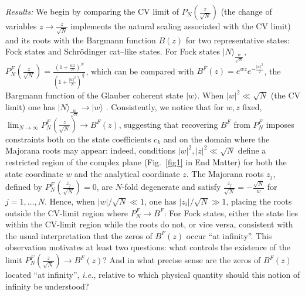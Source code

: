 \documentclass[aps,prl,showpacs,twocolumn]{revtex4-2}
\providecommand{\ket}[1]{\lvert #1 \rangle}
\providecommand{\ket}[1]{\lvert #1 \rangle}
\providecommand{\ket}[1]{\lvert #1 \rangle}
\providecommand{\ket}[1]{\lvert #1 \rangle}
\begin{document}
{\it Results:}  We begin by comparing the CV limit of $P_N\!\left(\frac{z}{\sqrt{N}}\right)$ (the change of variables $z \to \frac{z}{\sqrt{N}}$ implements the natural scaling associated with the CV limit) and its roots with the Bargmann function $B(z)$ for two representative states: Fock states and Schr\"odinger cat--like states. For Fock states $\ket{N}_{\frac{w}{\sqrt{N}}}$, $P_N^{F}\!\left(\frac{z}{\sqrt{N}}\right) = \frac{\left(1+\frac{w z}{N}\right)^N}{\left(1+\frac{|w|^2}{N}\right)^\frac{N}{2}}$, which can be compared with $B^{F}(z) = e^{w z} e^{-\frac{|w|^2}{2}}$, the Bargmann function of the Glauber coherent state $\ket{w}$. When $|w|^2 \ll \sqrt{N}$ (the CV limit) one has $\ket{N}_{\frac{w}{\sqrt{N}}} \to \ket{w}$ \cite{descamps2025unifiedframeworkbosonicquantum, descamps2024superselectionrules, saharyan2025}. Consistently, we notice that for $w, z$ fixed, $\lim_{N \to \infty} P_N^{F}\!\left(\frac{z}{\sqrt{N}}\right) \to B^{F}(z)$, suggesting that recovering $B^{F}$ from $P_N^{F}$ imposes constraints both on the state coefficients $c_k$ and on the domain where the Majorana roots may appear: indeed, conditions $|w|^2,|z|^2 \ll \sqrt{N}$ define a restricted region of the complex plane (Fig.~\ref{fig1} in End Matter) for both the state coordinate $w$ and the analytical coordinate $z$. The Majorana roots $z_j$, defined by $P_N^{F}\!\left(\frac{z_j}{\sqrt{N}}\right) = 0$, are $N$-fold degenerate and satisfy $\frac{z_j}{\sqrt{N}} = -\frac{\sqrt{N}}{w}$ for $j = 1,\ldots,N$. Hence, when $|w|/\sqrt{N} \ll 1$, one has $|z_i|/\sqrt{N} \gg 1$, placing the roots outside the CV-limit region where $P_N^{F} \to B^{F}$: For Fock states, either the state lies within the CV-limit region while the roots do not, or vice versa, consistent with the usual interpretation that the zeros of $B^{F}(z)$ occur ``at infinity''. This observation motivates at least two questions: what controls the existence of the limit $ P_N^{F}\!\left(\frac{z}{\sqrt{N}}\right) \to B^{F}(z)$? And in what precise sense are the zeros of $B^{F}(z)$ located ``at infinity'', {\it i.e.}, relative to which physical quantity should this notion of infinity be understood?
\end{document}
